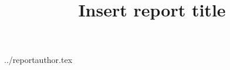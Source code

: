 \documentclass {article}
\begin{document}
\title {Insert report title}
 {../reportauthor.tex}
\maketitle
\end{document}

